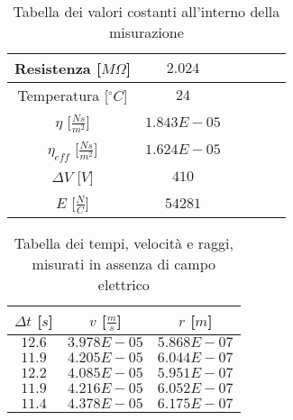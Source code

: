 \documentclass{article}
\begin{document}
\begin{multicols}{2}

\begin{table}[H]
	\centering
	\begin{tabular}{| c | c | c | c | c | c |}
		\hline
		Resistenza [$M\Omega$] & $2.024$\\
		\hline
		Temperatura [$^\circ C$]& $24$\\
		\hline
		$\eta$ [$\frac{Ns}{m^2}$] & $1.843E-05$\\
		\hline
		$\eta_{eff}$ [$\frac{Ns}{m^2}$] & $1.624E-05$\\
		\hline
		$\Delta V$ [$V$] & $410$\\
		\hline
		$E$ [$\frac N C$] & $54281$\\
		\hline
	\end{tabular}
	\caption{Tabella dei valori costanti all'interno della misurazione}
	\label{}
\end{table}

\columnbreak

\begin{table}[H]
	\centering
	\begin{tabular}{| c | c | c |}
		\hline
		$\Delta t$ [$s$] & $v$ [$\frac ms$] & $r$ [$m$] \\
		\hline
		$12.6$ & $3.978E-05$ & $5.868E-07$ \\
		$11.9$ & $4.205E-05$ & $6.044E-07$ \\
		$12.2$ & $4.085E-05$ & $5.951E-07$ \\
		$11.9$ & $4.216E-05$ & $6.052E-07$ \\
		$11.4$ & $4.378E-05$ & $6.175E-07$ \\
		\hline
	\end{tabular}
	\caption{Tabella dei tempi, velocità e raggi, misurati in assenza di campo elettrico}
	\label{}
\end{table}
	
\end{multicols}
\end{document}
